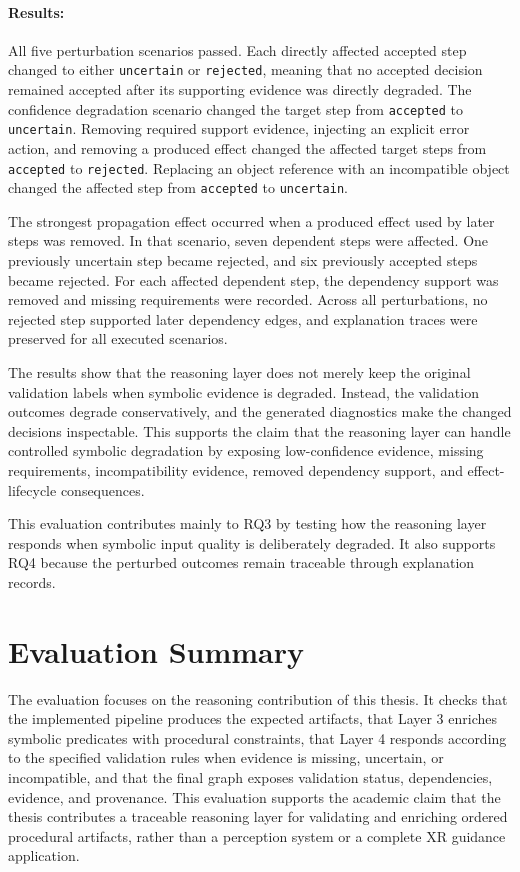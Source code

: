 \paragraph{Results:}
All five perturbation scenarios passed. Each directly affected accepted step
changed to either \texttt{uncertain} or \texttt{rejected}, meaning that no
accepted decision remained accepted after its supporting evidence was directly
degraded. The confidence degradation scenario changed the target step from
\texttt{accepted} to \texttt{uncertain}. Removing required support evidence,
injecting an explicit error action, and removing a produced effect changed the
affected target steps from \texttt{accepted} to \texttt{rejected}. Replacing an
object reference with an incompatible object changed the affected step from
\texttt{accepted} to \texttt{uncertain}.

The strongest propagation effect occurred when a produced effect used by later
steps was removed. In that scenario, seven dependent steps were affected. One
previously uncertain step became rejected, and six previously accepted steps
became rejected. For each affected dependent step, the dependency support was
removed and missing requirements were recorded. Across all perturbations, no
rejected step supported later dependency edges, and explanation traces were
preserved for all executed scenarios.

The results show that the reasoning layer does not merely keep the original
validation labels when symbolic evidence is degraded. Instead, the validation
outcomes degrade conservatively, and the generated diagnostics make the changed
decisions inspectable. This supports the claim that the reasoning layer can
handle controlled symbolic degradation by exposing low-confidence evidence,
missing requirements, incompatibility evidence, removed dependency support, and
effect-lifecycle consequences.

This evaluation contributes mainly to RQ3 by testing how the reasoning layer
responds when symbolic input quality is deliberately degraded. It also supports
RQ4 because the perturbed outcomes remain traceable through explanation records.



\section{Evaluation Summary}
\label{sec:evaluation-summary}

The evaluation focuses on the reasoning contribution of this thesis. It checks that the implemented pipeline produces the expected artifacts, that Layer 3 enriches symbolic predicates with procedural constraints, that Layer 4 responds according to the specified validation rules when evidence is missing, uncertain, or incompatible, and that the final graph exposes validation status, dependencies, evidence, and provenance. This evaluation supports the academic claim that the thesis contributes a traceable reasoning layer for validating and enriching ordered procedural artifacts, rather than a perception system or a complete XR guidance application.

